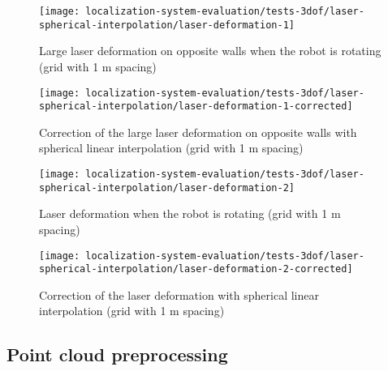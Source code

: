 \begin{figure}[H]
	\centering
	\texttt{[image: localization-system-evaluation/tests-3dof/laser-spherical-interpolation/laser-deformation-1]}
	\caption{Large laser deformation on opposite walls when the robot is rotating (grid with 1 m spacing)}
	\label{fig:localization-system-evaluation_laser-deformation-1}
\end{figure}

\begin{figure}[H]
	\centering
	\texttt{[image: localization-system-evaluation/tests-3dof/laser-spherical-interpolation/laser-deformation-1-corrected]}
	\caption{Correction of the large laser deformation on opposite walls with spherical linear interpolation  (grid with 1 m spacing)}
	\label{fig:localization-system-evaluation_laser-deformation-1-corrected}
\end{figure}


\begin{figure}[H]
	\centering
	\texttt{[image: localization-system-evaluation/tests-3dof/laser-spherical-interpolation/laser-deformation-2]}
	\caption{Laser deformation when the robot is rotating  (grid with 1 m spacing)}
	\label{fig:localization-system-evaluation_laser-deformation-2}
\end{figure}

\begin{figure}[H]
	\centering
	\texttt{[image: localization-system-evaluation/tests-3dof/laser-spherical-interpolation/laser-deformation-2-corrected]}
	\caption{Correction of the laser deformation with spherical linear interpolation  (grid with 1 m spacing)}
	\label{fig:localization-system-evaluation_laser-deformation-2-corrected}
\end{figure}



\subsection{Point cloud preprocessing}

